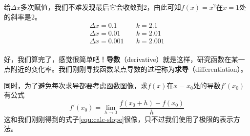 给$\Delta x$多次赋值，我们不难发现最后它会收敛到2，由此可知$f(x)=x^2$在$x=1$处的斜率是2。
\begin{align*}
    \Delta x=0.1\quad & k=2.1 \\
    \Delta x=0.01\quad & k=2.01 \\
    \Delta x=0.001\quad & k=2.001 \\
\end{align*}

好，我们算完了，感觉很简单吧！\textbf{导数}（derivative）就是这样，研究函数在某一点附近的变化率。我们刚刚寻找函数某点导数的过程称为\textbf{求导}（differentiation）。

同时，为了避免每次求导都要考虑函数图像，求$f(x)$在$x=x_0$处的导数$f'(x_0)$有公式\[f'(x_0)=\lim_{h\to0}\frac{f(x_0+h)-f(x_0)}{h}\]这和我们刚刚得到的式子\eqref{equ:calc-slope}很像，只不过我们使用了极限的表示方法。

